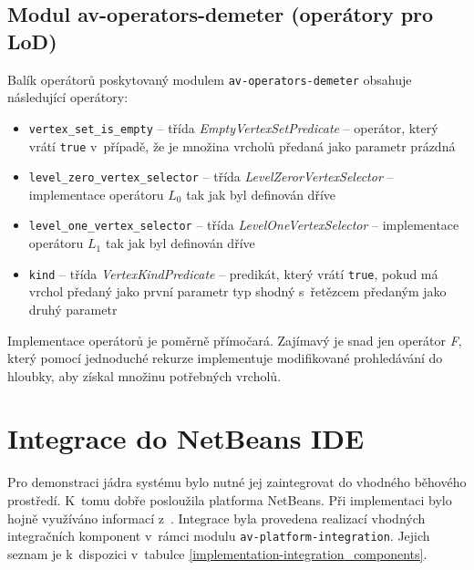 \subsection{Modul av-operators-demeter (operátory pro LoD)}
Balík operátorů poskytovaný modulem \verb+av-operators-demeter+ obsahuje následující operátory:

\begin{itemize}
\item \verb+vertex_set_is_empty+ -- třída \emph{EmptyVertexSetPredicate} -- operátor, který vrátí \verb+true+ v~případě, že je množina vrcholů předaná jako parametr prázdná
\item \verb+level_zero_vertex_selector+ -- třída \emph{LevelZerorVertexSelector} -- implementace operátoru $L_0$ tak jak byl definován dříve
\item \verb+level_one_vertex_selector+ -- třída \emph{LevelOneVertexSelector} -- implementace operátoru $L_1$ tak jak byl definován dříve
\item \verb+kind+ -- třída \emph{VertexKindPredicate} -- predikát, který vrátí \verb+true+, pokud má vrchol předaný jako první parametr typ shodný s~řetězcem předaným jako druhý parametr
\end{itemize}

Implementace operátorů je poměrně přímočará. Zajímavý je snad jen operátor \emph{F}, který pomocí jednoduché rekurze implementuje modifikované prohledávání do hloubky, aby získal množinu potřebných vrcholů.

\section{Integrace do NetBeans IDE}

Pro demonstraci jádra systému bylo nutné jej zaintegrovat do vhodného běhového prostředí. K~tomu dobře posloužila platforma NetBeans. Při implementaci bylo hojně využíváno informací z~\cite{netbeans_platform}. Integrace byla provedena realizací vhodných integračních komponent v~rámci modulu \verb+av-platform-integration+. Jejich seznam je k~dispozici v~tabulce \ref{implementation-integration_components}.

